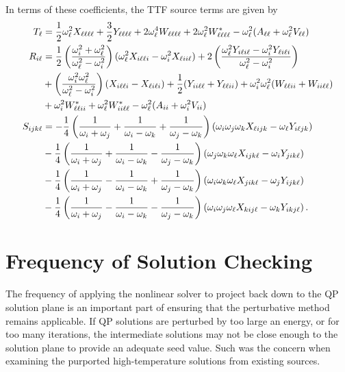 \documentclass[../PhD.tex]{subfiles}
\begin{document}
\begin{subappendices}
In terms of these coefficients, the TTF source terms are given by
\begin{align}
\label{T calc}
T_\ell &= \frac{1}{2} \omega_\ell^2 X_{\ell\ell\ell\ell} + \frac{3}{2} Y_{\ell\ell\ell\ell} + 2\omega_\ell^4 W_{\ell\ell\ell\ell} + 2\omega_\ell^2 W^*_{\ell\ell\ell\ell} - \omega_\ell^2 (A_{\ell\ell} + \omega_\ell^2 V_{\ell\ell} ) \\
\label{R calc}
R_{i\ell} &=\frac{1}{2} \left(\frac{\omega_i^2 + \omega_\ell^2}{\omega_\ell^2 - \omega_i^2}\right) (\omega_\ell^2 X_{i\ell\ell i} - \omega_i^2 X_{\ell ii\ell}) + 2\left(\frac{\omega_\ell^2 Y_{i\ell i\ell } - \omega_i^2 Y_{\ell i\ell i}}{\omega_\ell^2 - \omega_i^2} \right) \nonumber \\
&+ \left(\frac{\omega_i^2 \omega_\ell^2}{\omega_\ell^2 - \omega_i^2}\right) (X_{i\ell \ell i} - X_{\ell i\ell i}) + \frac{1}{2} (Y_{ii\ell \ell } + Y_{\ell \ell ii}) + \omega_i^2 \omega_\ell^2 (W_{\ell \ell ii} + W_{ii\ell \ell }) \nonumber \\
&+ \omega_i^2 W^*_{\ell \ell ii} + \omega_\ell^2 W^*_{ii\ell \ell } - \omega_\ell^2 (A_{ii} + \omega_i^2 V_{ii} ) \\
\label{S calc}
S_{ijk\ell } &= -\frac{1}{4} \left( \frac{1}{\omega_i + \omega_j} + \frac{1}{\omega_i - \omega_k} + \frac{1}{\omega_j - \omega_k} \right) (\omega_i \omega_j \omega_k X_{\ell ijk} - \omega_\ell  Y_{i\ell jk}) \nonumber \\
& - \frac{1}{4} \left( \frac{1}{\omega_i + \omega_j} +\frac{1}{\omega_i - \omega_k} - \frac{1}{\omega_j - \omega_k} \right) (\omega_j \omega_k \omega_\ell X_{ijk\ell } - \omega_i Y_{jik\ell } ) \nonumber \\
& -\frac{1}{4} \left( \frac{1}{\omega_i + \omega_j} - \frac{1}{\omega_i - \omega_k} + \frac{1}{\omega_j -\omega_k} \right) (\omega_i \omega_k \omega_\ell X_{jik\ell } - \omega_j Y_{ijk\ell } ) \nonumber \\
& -\frac{1}{4} \left( \frac{1}{\omega_i + \omega_j} - \frac{1}{\omega_i - \omega_k} - \frac{1}{\omega_j - \omega_k} \right) (\omega_i \omega_j \omega_\ell X_{kij\ell } - \omega_k Y_{ikj\ell }) \, .
\end{align}




\section{Frequency of Solution Checking}
\label{app: reop freq}

The frequency of applying the nonlinear solver to project back down to the QP solution plane is an important part of ensuring that the perturbative method remains applicable. If QP solutions are perturbed by too large an energy, or for too many iterations, the intermediate solutions may not be close enough to the solution plane to provide an adequate seed value. Such was the concern when examining the purported high-temperature solutions from existing sources.


\end{subappendices}
\end{document}
